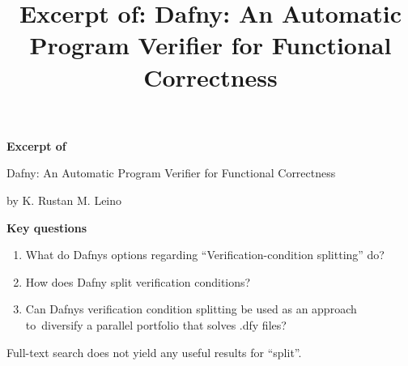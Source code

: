 \documentclass{scrartcl}
\title{Excerpt of: Dafny: An Automatic Program Verifier for Functional Correctness}
\begin{document}
\begin{center}
    \Large{\textbf{Excerpt of}}

    \LARGE{Dafny: An Automatic Program Verifier
for Functional Correctness}

    \large{by K. Rustan M. Leino}
\end{center}

\vspace{1cm}

\begin{addmargin}[0.2\linewidth]{0.2\linewidth}
    \begin{center}
        \textbf{Key questions}
    \end{center}
    \begin{enumerate}[i]
        \item What do Dafnys options regarding \enquote{Verification-condition splitting} do?
        \item How does Dafny split verification conditions?
        \item Can Dafnys verification condition splitting be used as an approach to\
            diversify a parallel portfolio that solves .dfy files?
    \end{enumerate}
\end{addmargin}

\vspace{1cm}

Full-text search does not yield any useful results for \enquote{split}.
\end{document}
